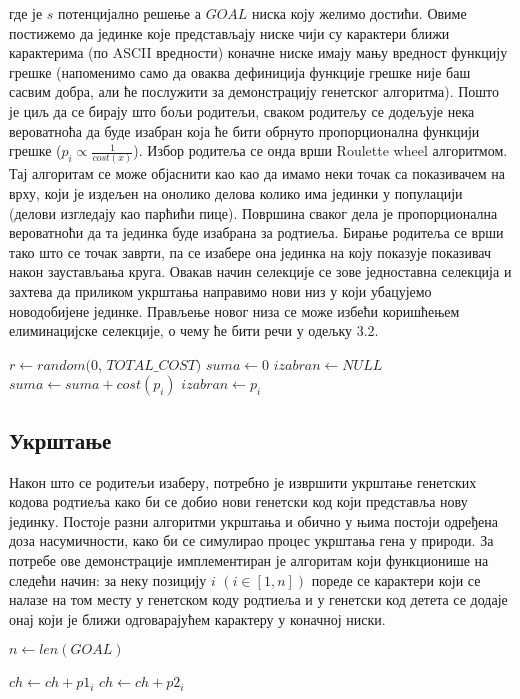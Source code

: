 \documentclass{article}
\begin{document}
где је $s$ потенцијално решење а $GOAL$ ниска коју желимо достићи. Овиме постижемо да 
јединке које представљају ниске чији су карактери ближи карактерима (по ASCII вредности) коначне ниске имају 
мању вредност функцију грешке (напоменимо само да оваква дефиниција функције грешке није 
баш сасвим добра, али ће послужити за демонстрацију генетског алгоритма). Пошто
је циљ да се бирају што бољи родитељи, сваком родитељу се додељује нека вероватноћа да буде изабран
која ће бити обрнуто пропорционална функцији грешке ($p_i \propto \frac{1}{cost(x)}$).
Избор родитеља се онда врши Roulette wheel алгоритмом. Тај алгоритам се може објаснити као
као да имамо неки точак са показивачем на врху, који је издељен на онолико делова колико има јединки у популацији
(делови изгледају као парћићи пице). Површина сваког дела је пропорционална вероватноћи да 
та јединка буде изабрана за родтиеља. Бирање родитеља се врши тако што се точак заврти, па 
се изабере она јединка на коју показује показивач након заустављања круга. Овакав начин селекције
се зове једноставна селекција и захтева да приликом укрштања направимо нови низ у који убацујемо
новодобијене јединке. Прављење новог низа се може избећи коришћењем елиминацијске селекције, о чему ће бити
речи у одељку 3.2.
\newline

\begin{algorithmic}
\State $r \gets random(0$, $TOTAL\_COST)$
\State $suma \gets 0$
\State $izabran \gets NULL$
    \State $suma \gets suma + cost(p_i)$
        \State $izabran \gets p_i$
    \EndIf
\EndFor

\end{algorithmic}


\subsection{Укрштање}
Након што се родитељи изаберу, потребно је извршити укрштање генетских кодова родтиеља
како би се добио нови генетски код који представља нову јединку. Постоје разни алгоритми укрштања
и обично у њима постоји одређена доза насумичности, како би се симулирао процес укрштања гена у природи.
За потребе ове демонстрације имплементиран је алгоритам који функционише на следећи начин: 
за неку позицију $i$ $(i \in [1, n])$ пореде се карактери који се налазе на том месту у генетском коду родтиеља
и у генетски код детета се додаје онај који је ближи одговарајућем карактеру у коначној ниски. 
\newpage
\begin{algorithmic}

\State $n \gets len(GOAL)$

        \State $ch \gets ch + p1_i$
    \Else
        \State $ch \gets ch + p2_i$
    \EndIf
\EndFor
\end{algorithmic}
\end{document}
